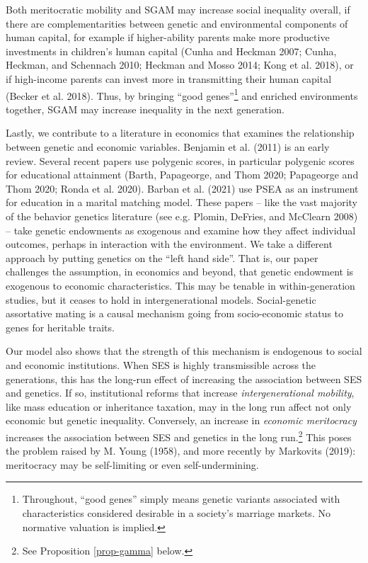 \documentclass[
  12pt,
]{article}
\theoremstyle{definition}
\theoremstyle{definition}
\theoremstyle{definition}
\theoremstyle{definition}
\theoremstyle{remark}
\begin{document}
Both meritocratic mobility and SGAM may increase social inequality overall,
if there are complementarities between genetic and environmental components of
human capital, for example if higher-ability parents make more productive
investments in children's human capital (Cunha and Heckman 2007; Cunha, Heckman, and Schennach 2010; Heckman and Mosso 2014; Kong et al. 2018), or if high-income
parents can invest more in transmitting their human capital (Becker et al. 2018).
Thus, by bringing ``good genes''\footnote{Throughout, ``good genes'' simply means genetic variants
  associated with characteristics considered desirable in a society's marriage
  markets. No normative valuation is implied.} and enriched environments together,
SGAM may increase inequality in the next generation.

Lastly, we contribute to a literature in economics that examines the
relationship between genetic and economic variables. Benjamin et al. (2011) is an
early review. Several recent papers use polygenic scores, in particular
polygenic scores for educational attainment (Barth, Papageorge, and Thom 2020; Papageorge and Thom 2020; Ronda et al. 2020). Barban et al. (2021) use PSEA as an
instrument for education in a marital matching model. These papers --
like the vast majority of the behavior genetics literature (see e.g. Plomin, DeFries, and McClearn 2008) -- take genetic endowments as exogenous and examine how
they affect individual outcomes, perhaps in interaction with the environment. We
take a different approach by putting genetics on the ``left hand side''. That is, our
paper challenges the assumption, in economics and beyond, that genetic endowment
is exogenous to economic characteristics. This may be tenable in
within-generation studies, but it ceases to hold in intergenerational models.
Social-genetic assortative mating is a causal mechanism going from
socio-economic status to genes for heritable traits.

Our model also shows that the strength of this mechanism is endogenous to
social and economic institutions. When SES is highly transmissible across the
generations, this has the long-run effect of increasing the association between
SES and genetics. If so, institutional reforms that increase \emph{intergenerational
mobility}, like mass education or inheritance taxation, may in the long run
affect not only economic but genetic inequality. Conversely, an increase in
\emph{economic meritocracy} increases the association between SES and genetics in the
long run.\footnote{See Proposition \ref{prop-gamma} below.} This poses the problem raised by M. Young (1958), and more
recently by Markovits (2019): meritocracy may be self-limiting or even
self-undermining.
\end{document}
